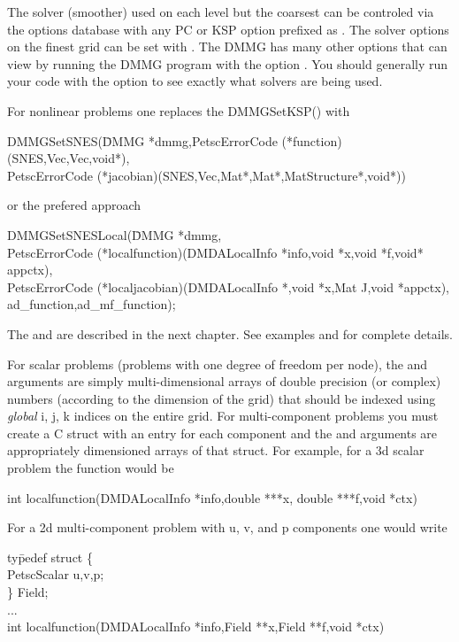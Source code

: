 The solver (smoother) used on each level but the coarsest can be controled via the options
database with any PC or KSP option prefixed as . The 
solver options on the finest grid can be set with  . The 
DMMG has many other options that can view by running the DMMG program with the option .
You should generally run your code with the option  to see exactly what 
solvers are being used.

For nonlinear problems one replaces the DMMGSetKSP() with 
\begin{tabbing}
  DMMGSetSNES(\=DMMG *dmmg,PetscErrorCode (*function)(SNES,Vec,Vec,void*),\\
             \>PetscErrorCode (*jacobian)(SNES,Vec,Mat*,Mat*,MatStructure*,void*))
\end{tabbing}
or the prefered approach
\begin{tabbing}
  DMMGSetSNESLocal(\=DMMG *dmmg,\\
  \>PetscErrorCode (*localfunction)(DMDALocalInfo *info,void *x,void *f,void* appctx),\\
  \>PetscErrorCode (*localjacobian)(DMDALocalInfo *,void *x,Mat J,void *appctx),\\
  \>ad\_function,ad\_mf\_function);
\end{tabbing}
The  and  are described in the next chapter. 
See examples  and  for complete details.

For scalar problems (problems with one degree of freedom per node),
the   and  arguments are simply
multi-dimensional arrays of double precision (or complex) numbers
(according to the dimension of the grid) that should be indexed using
{\em global} i, j, k indices on the entire grid. For multi-component
problems you must create a C struct with an entry for each component
and the  and  arguments are appropriately dimensioned
arrays of that struct. For example, for a 3d scalar problem the function
would be 
\begin{tabbing}
int localfunction(DMDALocalInfo *info,double ***x, double ***f,void *ctx)
\end{tabbing}
For a 2d multi-component problem with u, v, and p components one would write
\begin{tabbing}
ty\=pedef struct \{\\
  \> PetscScalar u,v,p;\\
 \} Field;\\
...\\
int localfunction(DMDALocalInfo *info,Field **x,Field **f,void *ctx)
\end{tabbing}


